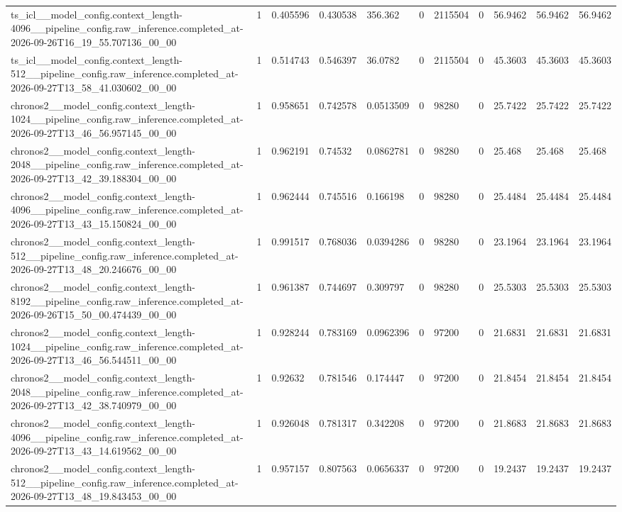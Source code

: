 \begin{tabular}{lllllllllll}
ts\_icl\_\_model\_config.context\_length-4096\_\_pipeline\_config.raw\_inference.completed\_at-2026-09-26T16\_19\_55.707136\_00\_00 & 1 & 0.405596 & 0.430538 & 356.362 & 0 & 2115504 & 0 & 56.9462 & 56.9462 & 56.9462 \\
ts\_icl\_\_model\_config.context\_length-512\_\_pipeline\_config.raw\_inference.completed\_at-2026-09-27T13\_58\_41.030602\_00\_00 & 1 & 0.514743 & 0.546397 & 36.0782 & 0 & 2115504 & 0 & 45.3603 & 45.3603 & 45.3603 \\
chronos2\_\_model\_config.context\_length-1024\_\_pipeline\_config.raw\_inference.completed\_at-2026-09-27T13\_46\_56.957145\_00\_00 & 1 & 0.958651 & 0.742578 & 0.0513509 & 0 & 98280 & 0 & 25.7422 & 25.7422 & 25.7422 \\
chronos2\_\_model\_config.context\_length-2048\_\_pipeline\_config.raw\_inference.completed\_at-2026-09-27T13\_42\_39.188304\_00\_00 & 1 & 0.962191 & 0.74532 & 0.0862781 & 0 & 98280 & 0 & 25.468 & 25.468 & 25.468 \\
chronos2\_\_model\_config.context\_length-4096\_\_pipeline\_config.raw\_inference.completed\_at-2026-09-27T13\_43\_15.150824\_00\_00 & 1 & 0.962444 & 0.745516 & 0.166198 & 0 & 98280 & 0 & 25.4484 & 25.4484 & 25.4484 \\
chronos2\_\_model\_config.context\_length-512\_\_pipeline\_config.raw\_inference.completed\_at-2026-09-27T13\_48\_20.246676\_00\_00 & 1 & 0.991517 & 0.768036 & 0.0394286 & 0 & 98280 & 0 & 23.1964 & 23.1964 & 23.1964 \\
chronos2\_\_model\_config.context\_length-8192\_\_pipeline\_config.raw\_inference.completed\_at-2026-09-26T15\_50\_00.474439\_00\_00 & 1 & 0.961387 & 0.744697 & 0.309797 & 0 & 98280 & 0 & 25.5303 & 25.5303 & 25.5303 \\
chronos2\_\_model\_config.context\_length-1024\_\_pipeline\_config.raw\_inference.completed\_at-2026-09-27T13\_46\_56.544511\_00\_00 & 1 & 0.928244 & 0.783169 & 0.0962396 & 0 & 97200 & 0 & 21.6831 & 21.6831 & 21.6831 \\
chronos2\_\_model\_config.context\_length-2048\_\_pipeline\_config.raw\_inference.completed\_at-2026-09-27T13\_42\_38.740979\_00\_00 & 1 & 0.92632 & 0.781546 & 0.174447 & 0 & 97200 & 0 & 21.8454 & 21.8454 & 21.8454 \\
chronos2\_\_model\_config.context\_length-4096\_\_pipeline\_config.raw\_inference.completed\_at-2026-09-27T13\_43\_14.619562\_00\_00 & 1 & 0.926048 & 0.781317 & 0.342208 & 0 & 97200 & 0 & 21.8683 & 21.8683 & 21.8683 \\
chronos2\_\_model\_config.context\_length-512\_\_pipeline\_config.raw\_inference.completed\_at-2026-09-27T13\_48\_19.843453\_00\_00 & 1 & 0.957157 & 0.807563 & 0.0656337 & 0 & 97200 & 0 & 19.2437 & 19.2437 & 19.2437 \\

\end{tabular}
